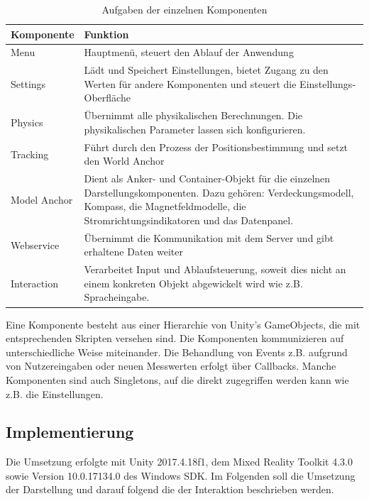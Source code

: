 \bgroup
\setlength\extrarowheight{-2pt}
\def\arraystretch{2}
\begin{table}[H]
	\centering
	\begin{tabular}{m{2.5cm}|m{8cm}}
		Komponente & Funktion\\
		\hline
		\hline
		Menu & Hauptmenü, steuert den Ablauf der Anwendung\\
		\hline
		Settings & Lädt und Speichert Einstellungen, bietet Zugang zu den Werten für andere Komponenten und steuert die Einstellungs-Oberfläche\\
		\hline
		Physics & Übernimmt alle physikalischen Berechnungen. Die physikalischen Parameter lassen sich konfigurieren.\\
		\hline
		Tracking & Führt durch den Prozess der Positionsbestimmung und setzt den World Anchor\\
		\hline
		Model Anchor & Dient als Anker- und Container-Objekt für die einzelnen Darstellungskomponenten. Dazu gehören: Verdeckungsmodell, Kompass, die Magnetfeldmodelle, die Stromrichtungsindikatoren und das Datenpanel.\\
		\hline
		Webservice & Übernimmt die Kommunikation mit dem Server und gibt erhaltene Daten weiter\\
		\hline
		Interaction & Verarbeitet Input und Ablaufsteuerung, soweit dies nicht an einem konkreten Objekt abgewickelt wird wie z.B. Spracheingabe.\\
	\end{tabular}\caption{\label{tab:components-details} Aufgaben der einzelnen Komponenten}
\end{table}
\egroup

Eine Komponente besteht aus einer Hierarchie von Unity's GameObjects, die mit entsprechenden Skripten versehen sind. Die Komponenten kommunizieren auf unterschiedliche Weise miteinander. Die Behandlung von Events z.B. aufgrund von Nutzereingaben oder neuen Messwerten erfolgt über Callbacks. Manche Komponenten sind auch Singletons, auf die direkt zugegriffen werden kann wie z.B. die Einstellungen.

\subsection{Implementierung}
\label{sec-5-2}
Die Umsetzung erfolgte mit Unity 2017.4.18f1, dem Mixed Reality Toolkit 4.3.0 sowie Version 10.0.17134.0 des Windows SDK. Im Folgenden soll die Umsetzung der Darstellung und darauf folgend die der Interaktion beschrieben werden.

